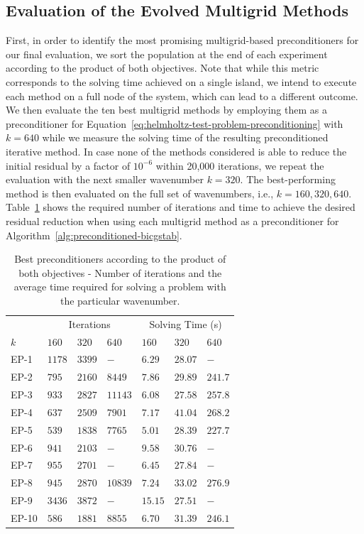 \subsection{Evaluation of the Evolved Multigrid Methods}
First, in order to identify the most promising multigrid-based preconditioners for our final evaluation, we sort the population at the end of each experiment according to the product of both objectives.
Note that while this metric corresponds to the solving time achieved on a single island, we intend to execute each method on a full node of the system, which can lead to a different outcome.
We then evaluate the ten best multigrid methods by employing them as a preconditioner for Equation~\eqref{eq:helmholtz-test-problem-preconditioning} with $k = 640$ while we measure the solving time of the resulting preconditioned iterative method.
In case none of the methods considered is able to reduce the initial residual by a factor of $10^{-6}$ within 20,000 iterations, we repeat the evaluation with the next smaller wavenumber $k = 320$.
The best-performing method is then evaluated on the full set of wavenumbers, i.e., $k = 160, 320, 640$.
Table~\ref{table:evolved-solvers} shows the required number of iterations and time to achieve the desired residual reduction when using each multigrid method as a preconditioner for Algorithm~\ref{alg:preconditioned-bicgstab}.
\begin{table}
	\caption{Best preconditioners according to the product of both objectives - Number of iterations and the average time required for solving a problem with the particular wavenumber.}
	\label{table:evolved-solvers}
	\centering
	\begin{tabular}{l l l l l l l }
		\toprule
		& \multicolumn{3}{c}{Iterations} & \multicolumn{3}{c}{Solving Time (s)} \\
		\cmidrule(l){2-4} \cmidrule(l){5-7}
		$k$ & $160$ & $320$ & $640$ & $160$ & $320$ & $640$ \\
		\midrule
		EP-1 & $1178$ & $3399$ & $-$ & $6.29$ & $28.07$ & $-$ \\
		\midrule
		EP-2 & $795$ & $2160$ & $8449$ & $7.86$ & $29.89$ & $241.7$\\
		\midrule
		EP-3 & $933$ & $2827$ & $11143$ & $6.08$ & $27.58$ & $257.8$ \\
		\midrule
		EP-4 & $637$ & $2509$ & $7901$ & $7.17$& $41.04$ & $268.2$ \\
		\midrule
		EP-5 & $539$ & $1838$ & $7765$ & $5.01$ & $28.39$ & $227.7$ \\
		\midrule
		EP-6 & $941$ & $2103$ & $-$ & $9.58$ & $30.76$ & $-$ \\
		\midrule
		EP-7 & $955$ & $2701$ & $-$  & $6.45$& $27.84$ & $-$ \\
		\midrule
		EP-8 & $945$ & $2870$ & $10839$ & $7.24$ & $33.02$ & $276.9$ \\
		\midrule
		EP-9 & $3436$ & $3872$ & $-$  & $15.15$ & $27.51$ & $-$ \\
		\midrule
		EP-10 & $586$ & $1881$ & $8855$ & $6.70$ & $31.39$ & $246.1$ \\
		\bottomrule
	\end{tabular}
\end{table}
